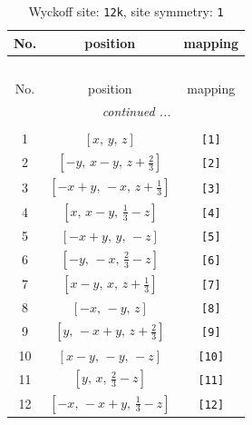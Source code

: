 \documentclass[fleqn,8pt]{jsarticle}
\begin{document}
\renewcommand{\arraystretch}{1.2}
\begin{longtable}{ccc}
\caption{Wyckoff site: {\tt 12k}, site symmetry: {\tt 1}}
 \\
 \hline \hline
No. & position & mapping \\ \hline \endfirsthead

\multicolumn{2}{l}{\tablename\ \thetable{}} \\
 \hline \hline
No. & position & mapping \\ \hline \endhead

 \hline \hline
\multicolumn{2}{r}{\footnotesize\it continued ...} \\ \endfoot

 \hline \hline
\multicolumn{2}{r}{} \\ \endlastfoot

1 & $\left[ x,\, y,\, z \right]$ & {\tt [1]} \\ \hline
2 & $\left[ - y,\, x - y,\, z + \frac{2}{3} \right]$ & {\tt [2]} \\ \hline
3 & $\left[ - x + y,\, - x,\, z + \frac{1}{3} \right]$ & {\tt [3]} \\ \hline
4 & $\left[ x,\, x - y,\, \frac{1}{3} - z \right]$ & {\tt [4]} \\ \hline
5 & $\left[ - x + y,\, y,\, - z \right]$ & {\tt [5]} \\ \hline
6 & $\left[ - y,\, - x,\, \frac{2}{3} - z \right]$ & {\tt [6]} \\ \hline
7 & $\left[ x - y,\, x,\, z + \frac{1}{3} \right]$ & {\tt [7]} \\ \hline
8 & $\left[ - x,\, - y,\, z \right]$ & {\tt [8]} \\ \hline
9 & $\left[ y,\, - x + y,\, z + \frac{2}{3} \right]$ & {\tt [9]} \\ \hline
10 & $\left[ x - y,\, - y,\, - z \right]$ & {\tt [10]} \\ \hline
11 & $\left[ y,\, x,\, \frac{2}{3} - z \right]$ & {\tt [11]} \\ \hline
12 & $\left[ - x,\, - x + y,\, \frac{1}{3} - z \right]$ & {\tt [12]} \\
\end{longtable}
\end{document}
